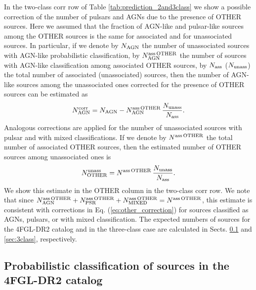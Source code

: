 \documentclass[referee]{aa} %
\newcommand{\bea}{\begin{eqnarray}}
\newcommand{\eea}{\end{eqnarray}}
\newcommand{\lb}{\label}
\begin{document}
In the two-class corr row of Table \ref{tab:prediction_2and3class}
we show a possible correction of the number of pulsars and AGNs due to the presence of OTHER sources.
Here we assumed that the fraction of AGN-like and pulsar-like sources among the OTHER sources is the same for associated and for unassociated sources.
In particular, if we denote by $N_{\rm AGN}$ the number of unassociated sources with AGN-like probabilistic classification,
by $N_{\rm AGN}^{\rm ass\,OTHER}$ the number of sources with AGN-like classification among associated OTHER sources,
by $N_{\rm ass}$ ($N_{\rm unass}$) the total number of associated (unassociated) sources, then
the number of AGN-like sources among the unassociated ones corrected for the presence of OTHER sources can be estimated as
\bea
\lb{eq:other_correction}
N_{\rm AGN}^{\rm corr} = N_{\rm AGN} - N_{\rm AGN}^{\rm ass\,OTHER} \,\frac{N_{\rm unass}}{N_{\rm ass}}.
\eea
Analogous corrections are applied for the number of unassociated sources with pulsar and with mixed classifications.
If we denote by $N^{\rm ass\,OTHER}$ the total number of associated OTHER sources, then the estimated number of 
OTHER sources among unassociated ones is
\bea
\lb{eq:2class_other}
N^{\rm unass}_{\rm OTHER} = N^{\rm ass\,OTHER} \,\frac{N_{\rm unass}}{N_{\rm ass}}.
\eea
We show this estimate in the OTHER column in the two-class corr row.
We note that since 
$N_{\rm AGN}^{\rm ass\,OTHER} + N_{\rm PSR}^{\rm ass\,OTHER} + N_{\rm MIXED}^{\rm ass\,OTHER} = N^{\rm ass\,OTHER}$,
this estimate is consistent with corrections in Eq. (\ref{eq:other_correction}) for sources classified as AGNs, pulsars, or with mixed classification.
The expected numbers of sources for the 4FGL-DR2 catalog and in the three-class case are calculated in Sects. \ref{sec:4FGLprediction}
and \ref{sec:3class}, respectively.


\subsection{Probabilistic classification of sources in the 4FGL-DR2 catalog}
\lb{sec:4FGLprediction}
\end{document}
